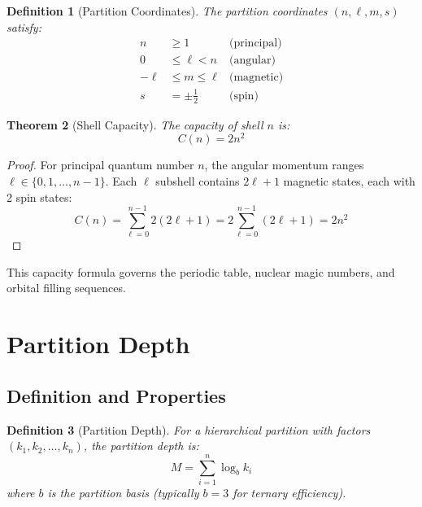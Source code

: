 \documentclass[twocolumn,amsmath,amssymb,aps,prl,superscriptaddress]{revtex4-2}
\newtheorem{theorem}{Theorem}[section]
\newtheorem{definition}[theorem]{Definition}
\newcommand{\Mpart}{M}
\begin{document}
\begin{definition}[Partition Coordinates]
\label{def:coords}
The partition coordinates $(n, \ell, m, s)$ satisfy:
\begin{align}
n &\geq 1 & \text{(principal)} \\
0 &\leq \ell < n & \text{(angular)} \\
-\ell &\leq m \leq \ell & \text{(magnetic)} \\
s &= \pm \tfrac{1}{2} & \text{(spin)}
\end{align}
\end{definition}

\begin{theorem}[Shell Capacity]
\label{thm:capacity}
The capacity of shell $n$ is:
\begin{equation}
C(n) = 2n^2
\end{equation}
\end{theorem}

\begin{proof}
For principal quantum number $n$, the angular momentum ranges $\ell \in \{0, 1, \ldots, n-1\}$. Each $\ell$ subshell contains $2\ell + 1$ magnetic states, each with 2 spin states:
\begin{equation}
C(n) = \sum_{\ell=0}^{n-1} 2(2\ell + 1) = 2 \sum_{\ell=0}^{n-1}(2\ell + 1) = 2n^2
\end{equation}
\end{proof}

This capacity formula governs the periodic table, nuclear magic numbers, and orbital filling sequences.

\section{Partition Depth}
\label{sec:depth}

\subsection{Definition and Properties}

\begin{definition}[Partition Depth]
\label{def:depth}
For a hierarchical partition with factors $(k_1, k_2, \ldots, k_n)$, the partition depth is:
\begin{equation}
\boxed{\Mpart = \sum_{i=1}^{n} \log_b k_i}
\end{equation}
where $b$ is the partition basis (typically $b = 3$ for ternary efficiency).
\end{definition}
\end{document}
